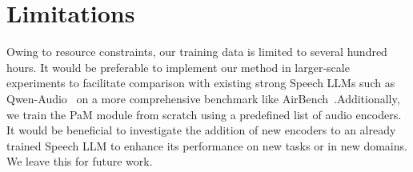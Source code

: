 \section{Limitations}

Owing to resource constraints, our training data is limited to several hundred hours. It would be preferable to implement our method in larger-scale experiments to facilitate comparison with existing strong Speech LLMs such as Qwen-Audio~\cite{Qwen2-Audio} on a more comprehensive benchmark like AirBench~\cite{yang2024air}.Additionally, we train the PaM module from scratch using a predefined list of audio encoders. It would be beneficial to investigate the addition of new encoders to an already trained Speech LLM to enhance its performance on new tasks or in new domains. We leave this for future work.